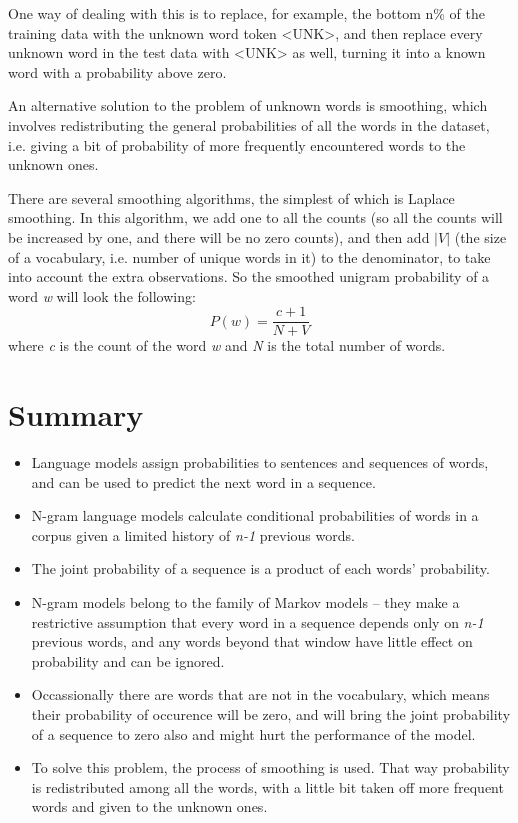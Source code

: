 One way of dealing with this is to replace, for example, the bottom n\% of the training data with the unknown word token <UNK>, and then replace every unknown word in the test data with <UNK> as well, turning it into a known word with a probability above zero.

An alternative solution to the problem of unknown words is smoothing, which involves redistributing the general probabilities of all the words in the dataset, i.e. giving a bit of probability of more frequently encountered words to the unknown ones.

There are several smoothing algorithms, the simplest of which is Laplace smoothing. In this algorithm, we add one to all the counts (so all the counts will be increased by one, and there will be no zero counts), and then add $|V|$ (the size of a vocabulary, i.e. number of unique words in it) to the denominator, to take into account the extra observations. So the smoothed unigram probability of a word \textit{w} will look the following:
\begin{equation}
    P(w)=\frac{c+1}{N+V}
\end{equation}
where \textit{c} is the count of the word \textit{w} and \textit{N} is the total number of words.

\section{Summary}
\label{sec:NgramBackground-Summary}
\begin{itemize}
    \item Language models assign probabilities to sentences and sequences of words, and can be used to predict the next word in a sequence.
    \item N-gram language models calculate conditional probabilities of words in a corpus given a limited history of \textit{n-1} previous words.
    \item The joint probability of a sequence is a product of each words' probability.
    \item N-gram models belong to the family of Markov models -- they make a restrictive assumption that every word in a sequence depends only on \textit{n-1} previous words, and any words beyond that window have little effect on probability and can be ignored.
    \item Occassionally there are words that are not in the vocabulary, which means their probability of occurence will be zero, and will bring the joint probability of a sequence to zero also and might hurt the performance of the model.
    \item To solve this problem, the process of smoothing is used. That way probability is redistributed among all the words, with a little bit taken off more frequent words and given to the unknown ones.
\end{itemize}